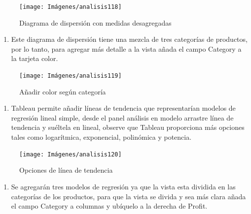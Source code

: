 \documentclass[
]{book}
\providecommand{\tightlist}{%
  \setlength{\itemsep}{0pt}\setlength{\parskip}{0pt}}
\begin{document}
\begin{figure}

{\centering \texttt{[image: Imágenes/analisis118]} 

}

\caption{Diagrama de dispersión con medidas desagregadas}\label{fig:paso3dispersion-fig}
\end{figure}

\begin{enumerate}
\def\labelenumi{\arabic{enumi}.}
\setcounter{enumi}{3}
\tightlist
\item
  Este diagrama de dispersión tiene una mezcla de tres categorías de productos, por lo tanto, para agregar más detalle a la vista añada el campo Category a la tarjeta color.
\end{enumerate}

\begin{figure}

{\centering \texttt{[image: Imágenes/analisis119]} 

}

\caption{Añadir color según categoría}\label{fig:paso4dispersion-fig}
\end{figure}

\begin{enumerate}
\def\labelenumi{\arabic{enumi}.}
\setcounter{enumi}{4}
\tightlist
\item
  Tableau permite añadir líneas de tendencia que representarían modelos de regresión lineal simple, desde el panel análisis en modelo arrastre línea de tendencia y suéltela en lineal, observe que Tableau proporciona más opciones tales como logarítmica, exponencial, polinómica y potencia.
\end{enumerate}

\begin{figure}

{\centering \texttt{[image: Imágenes/analisis120]} 

}

\caption{Opciones de línea de tendencia}\label{fig:paso5dispersion-fig}
\end{figure}

\begin{enumerate}
\def\labelenumi{\arabic{enumi}.}
\setcounter{enumi}{5}
\tightlist
\item
  Se agregarán tres modelos de regresión ya que la vista esta dividida en las categorías de los productos, para que la vista se divida y sea más clara añada el campo Category a columnas y ubíquelo a la derecha de Profit.
\end{enumerate}
\end{document}

